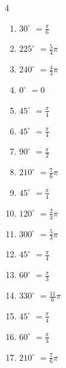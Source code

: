 \begin{multicols}{4}
\begin{enumerate}
  \item $\displaystyle 30^{\circ}$
        $\displaystyle =\frac{\pi}{6}$

  \item $\displaystyle 225^{\circ}$
        $\displaystyle =\frac{5}{4}\pi$

  \item $\displaystyle 240^{\circ}$
        $\displaystyle =\frac{4}{3}\pi$

  \item $\displaystyle 0^{\circ}$
        $\displaystyle =0$

  \item $\displaystyle 45^{\circ}$
        $\displaystyle =\frac{\pi}{4}$

  \item $\displaystyle 45^{\circ}$
        $\displaystyle =\frac{\pi}{4}$

  \item $\displaystyle 90^{\circ}$
        $\displaystyle =\frac{\pi}{2}$

  \item $\displaystyle 210^{\circ}$
        $\displaystyle =\frac{7}{6}\pi$

  \item $\displaystyle 45^{\circ}$
        $\displaystyle =\frac{\pi}{4}$

  \item $\displaystyle 120^{\circ}$
        $\displaystyle =\frac{2}{3}\pi$

  \item $\displaystyle 300^{\circ}$
        $\displaystyle =\frac{5}{3}\pi$

  \item $\displaystyle 45^{\circ}$
        $\displaystyle =\frac{\pi}{4}$

  \item $\displaystyle 60^{\circ}$
        $\displaystyle =\frac{\pi}{3}$

  \item $\displaystyle 330^{\circ}$
        $\displaystyle =\frac{11}{6}\pi$

  \item $\displaystyle 45^{\circ}$
        $\displaystyle =\frac{\pi}{4}$

  \item $\displaystyle 60^{\circ}$
        $\displaystyle =\frac{\pi}{3}$

\columnbreak %

  \item $\displaystyle 210^{\circ}$
        $\displaystyle =\frac{7}{6}\pi$


\end{enumerate}
\end{multicols}
